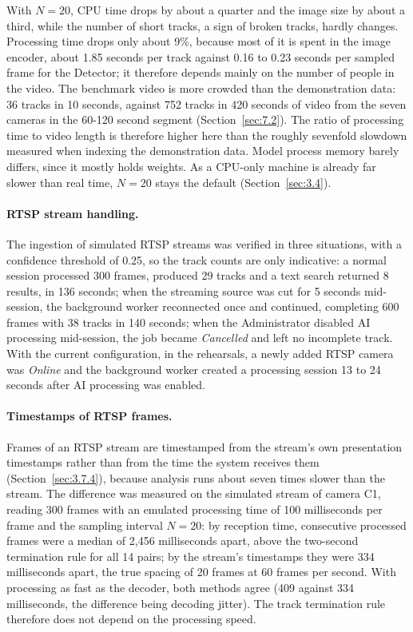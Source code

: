 With $N = 20$, CPU time drops by about a quarter and the image size by about a third, while the number of short tracks, a sign of broken tracks, hardly changes. Processing time drops only about 9\%, because most of it is spent in the image encoder, about 1.85 seconds per track against 0.16 to 0.23 seconds per sampled frame for the Detector; it therefore depends mainly on the number of people in the video. The benchmark video is more crowded than the demonstration data: 36 tracks in 10 seconds, against 752 tracks in 420 seconds of video from the seven cameras in the 60-120 second segment (Section~\ref{sec:7.2}). The ratio of processing time to video length is therefore higher here than the roughly sevenfold slowdown measured when indexing the demonstration data. Model process memory barely differs, since it mostly holds weights. As a CPU-only machine is already far slower than real time, $N = 20$ stays the default (Section~\ref{sec:3.4}).

\paragraph{RTSP stream handling.} The ingestion of simulated RTSP streams was verified in three situations, with a confidence threshold of 0.25, so the track counts are only indicative: a normal session processed 300 frames, produced 29 tracks and a text search returned 8 results, in 136 seconds; when the streaming source was cut for 5 seconds mid-session, the background worker reconnected once and continued, completing 600 frames with 38 tracks in 140 seconds; when the Administrator disabled AI processing mid-session, the job became \emph{Cancelled} and left no incomplete track. With the current configuration, in the rehearsals, a newly added RTSP camera was \emph{Online} and the background worker created a processing session 13 to 24 seconds after AI processing was enabled.

\paragraph{Timestamps of RTSP frames.} Frames of an RTSP stream are timestamped from the stream's own presentation timestamps rather than from the time the system receives them (Section~\ref{sec:3.7.4}), because analysis runs about seven times slower than the stream. The difference was measured on the simulated stream of camera C1, reading 300 frames with an emulated processing time of 100 milliseconds per frame and the sampling interval $N = 20$: by reception time, consecutive processed frames were a median of 2,456 milliseconds apart, above the two-second termination rule for all 14 pairs; by the stream's timestamps they were 334 milliseconds apart, the true spacing of 20 frames at 60 frames per second. With processing as fast as the decoder, both methods agree (409 against 334 milliseconds, the difference being decoding jitter). The track termination rule therefore does not depend on the processing speed.

